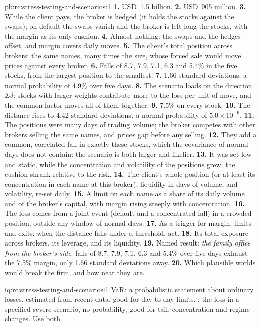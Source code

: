 \begin{solution}{pb:rc:stress-testing-and-scenarios:1}
\textbf{1.} USD~1.5 billion.
\textbf{2.} USD~905 million.
\textbf{3.} While the client pays, the broker is hedged (it holds the stocks against the swaps); on
default the swaps vanish and the broker is left long the stocks, with the margin as its only cushion.
\textbf{4.} Almost nothing: the swaps and the hedges offset, and margin covers daily moves.
\textbf{5.} The client's total position across brokers: the same names, many times the size, whose
forced sale would move prices against every broker.
\textbf{6.} Falls of 8.7, 7.9, 7.1, 6.3 and 5.4\% in the five stocks, from the largest position to the
smallest.
\textbf{7.} 1.66 standard deviations; a normal probability of 4.9\% over five days.
\textbf{8.} The scenario loads on the direction $\Sigma\delta$: stocks with larger weights contribute more to
the loss per unit of move, and the common factor moves all of them together.
\textbf{9.} 7.5\% on every stock.
\textbf{10.} The distance rises to 4.42 standard deviations, a normal probability of $5.0\times10^{-6}$.
\textbf{11.} The positions were many days of trading volume; the broker competes with other brokers
selling the same names, and prices gap before any selling.
\textbf{12.} They add a common, correlated fall in exactly these stocks, which the covariance of
normal days does not contain: the scenario is both larger and likelier.
\textbf{13.} It was set low and static, while the concentration and volatility of the positions grew:
the cushion shrank relative to the risk.
\textbf{14.} The client's whole position (or at least its concentration in each name at this broker),
liquidity in days of volume, and volatility, re-set daily.
\textbf{15.} A limit on each name as a share of its daily volume and of the broker's capital, with
margin rising steeply with concentration.
\textbf{16.} The loss comes from a joint event (default and a concentrated fall) in a crowded
position, outside any window of normal days.
\textbf{17.} As a trigger for margin, limits and exits: when the distance falls under a threshold, act.
\textbf{18.} Its total exposure across brokers, its leverage, and its liquidity.
\textbf{19.} Named result: \emph{the family office from the broker's side}: falls of 8.7, 7.9, 7.1, 6.3 and
5.4\% over five days exhaust the 7.5\% margin, only 1.66 standard deviations away.
\textbf{20.} Which plausible worlds would break the firm, and how near they are.
\end{solution}

\begin{solution}{iq:rc:stress-testing-and-scenarios:1}
VaR: a probabilistic statement about ordinary losses, estimated from recent data, good for
day-to-day limits. : the loss in a specified severe scenario, no probability, good for
tail, concentration and regime changes. Use both.
\end{solution}

